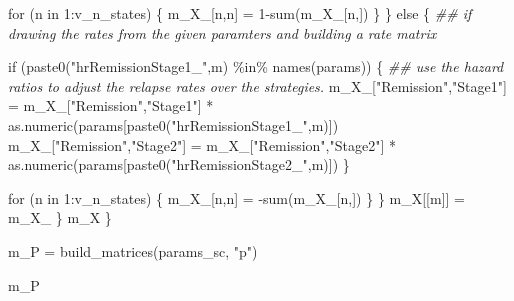 \documentclass[
  letterpaper,
  DIV=11,
  numbers=noendperiod,
  oneside]{scrartcl}
\newenvironment{Shaded}{\begin{snugshade}}{\end{snugshade}}
\newcommand{\ControlFlowTok}[1]{\textcolor[rgb]{0.00,0.23,0.31}{#1}}
\newcommand{\DecValTok}[1]{\textcolor[rgb]{0.68,0.00,0.00}{#1}}
\newcommand{\DocumentationTok}[1]{\textcolor[rgb]{0.37,0.37,0.37}{\textit{#1}}}
\newcommand{\FunctionTok}[1]{\textcolor[rgb]{0.28,0.35,0.67}{#1}}
\newcommand{\NormalTok}[1]{\textcolor[rgb]{0.00,0.23,0.31}{#1}}
\newcommand{\OtherTok}[1]{\textcolor[rgb]{0.00,0.23,0.31}{#1}}
\newcommand{\SpecialCharTok}[1]{\textcolor[rgb]{0.37,0.37,0.37}{#1}}
\newcommand{\StringTok}[1]{\textcolor[rgb]{0.13,0.47,0.30}{#1}}
\begin{document}
\begin{Shaded}
\begin{Highlighting}[]
      \ControlFlowTok{for}\NormalTok{ (n }\ControlFlowTok{in} \DecValTok{1}\SpecialCharTok{:}\NormalTok{v\_n\_states) \{}
\NormalTok{        m\_X\_[n,n] }\OtherTok{=} \DecValTok{1}\SpecialCharTok{{-}}\FunctionTok{sum}\NormalTok{(m\_X\_[n,])}
\NormalTok{      \}}
\NormalTok{    \} }\ControlFlowTok{else}\NormalTok{ \{}
      \DocumentationTok{\#\# if drawing the rates from the given paramters and building a rate matrix}
      
      \ControlFlowTok{if}\NormalTok{ (}\FunctionTok{paste0}\NormalTok{(}\StringTok{"hrRemissionStage1\_"}\NormalTok{,m) }\SpecialCharTok{\%in\%} \FunctionTok{names}\NormalTok{(params)) \{}
        \DocumentationTok{\#\# use the hazard ratios to adjust the relapse rates over the strategies. }
\NormalTok{        m\_X\_[}\StringTok{"Remission"}\NormalTok{,}\StringTok{"Stage1"}\NormalTok{] }\OtherTok{=}\NormalTok{ m\_X\_[}\StringTok{"Remission"}\NormalTok{,}\StringTok{"Stage1"}\NormalTok{] }\SpecialCharTok{*} \FunctionTok{as.numeric}\NormalTok{(params[}\FunctionTok{paste0}\NormalTok{(}\StringTok{"hrRemissionStage1\_"}\NormalTok{,m)])}
\NormalTok{        m\_X\_[}\StringTok{"Remission"}\NormalTok{,}\StringTok{"Stage2"}\NormalTok{] }\OtherTok{=}\NormalTok{ m\_X\_[}\StringTok{"Remission"}\NormalTok{,}\StringTok{"Stage2"}\NormalTok{] }\SpecialCharTok{*} \FunctionTok{as.numeric}\NormalTok{(params[}\FunctionTok{paste0}\NormalTok{(}\StringTok{"hrRemissionStage2\_"}\NormalTok{,m)])}
\NormalTok{      \}}
        
      \ControlFlowTok{for}\NormalTok{ (n }\ControlFlowTok{in} \DecValTok{1}\SpecialCharTok{:}\NormalTok{v\_n\_states) \{}
\NormalTok{        m\_X\_[n,n] }\OtherTok{=} \SpecialCharTok{{-}}\FunctionTok{sum}\NormalTok{(m\_X\_[n,])}
\NormalTok{      \}}
\NormalTok{    \}}
\NormalTok{    m\_X[[m]] }\OtherTok{=}\NormalTok{ m\_X\_}
\NormalTok{  \}}
\NormalTok{  m\_X}
\NormalTok{\}}
    
\NormalTok{m\_P }\OtherTok{=} \FunctionTok{build\_matrices}\NormalTok{(params\_sc, }\StringTok{"p"}\NormalTok{)}

\NormalTok{m\_P}
\end{Highlighting}
\end{Shaded}
\end{document}
